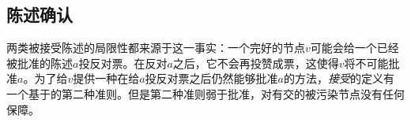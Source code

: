 \subsection{陈述确认}

两类被接受陈述的局限性都来源于这一事实：一个完好的节点$v$可能会给一个已经被批准的陈述$a$投反对票。在反对$a$之后，它不会再投赞成票，这使得$v$将不可能批准$a$。为了给$v$提供一种在给$a$投反对票之后仍然能够批准$a$的方法，\textit{接受}的定义有一个基于{\vblock}的第二种准则。但是第二种准则弱于批准，对有{\quorum}交的被污染节点没有任何保障。